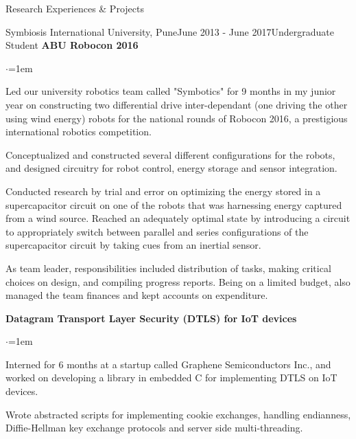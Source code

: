 \documentclass{resume}
\begin{document}
\begin{rSection}{Research Experiences \& Projects}
\begin{rSubsection}{Symbiosis International University, Pune}{June 2013 - June 2017}{Undergraduate Student}{}
{\textbullet \hspace{0.1em} \textbf{ABU Robocon 2016}}

\vspace*{-0.2em}
\begin{list}{$\cdot$}{\leftmargin=1em}
\item Led our university robotics team called "Symbotics" for 9 months in my junior year on constructing two differential drive inter-dependant (one driving the other using wind energy) robots for the national rounds of Robocon 2016, a prestigious international robotics competition.
\item Conceptualized and constructed several different configurations for the robots, and designed circuitry for robot control, energy storage and sensor integration. 
\item Conducted research by trial and error on optimizing the energy stored in a supercapacitor circuit on one of the robots that was harnessing energy captured from a wind source. Reached an adequately optimal state by introducing a circuit to appropriately switch between parallel and series configurations of the supercapacitor circuit by taking cues from an inertial sensor.
\item As team leader, responsibilities included distribution of tasks, making critical choices on design, and compiling progress reports. Being on a limited budget, also managed the team finances and kept accounts on expenditure.
\end{list}

{\textbullet \hspace{0.1em} \textbf{Datagram Transport Layer Security (DTLS) for IoT devices}}

\vspace*{-0.2em}
\begin{list}{$\cdot$}{\leftmargin=1em}
\item Interned for 6 months at a startup called Graphene Semiconductors Inc., and worked on developing a library in embedded C for implementing DTLS on IoT devices.
\item Wrote abstracted scripts for implementing cookie exchanges, handling endianness, Diffie-Hellman key exchange protocols and server side multi-threading.
\end{list}
\end{rSubsection}
\end{rSection}
\end{document}
